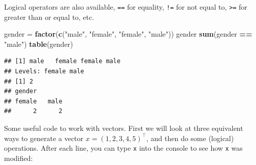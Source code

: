 \documentclass[]{article}
\newenvironment{Shaded}{\begin{snugshade}}{\end{snugshade}}
\newcommand{\KeywordTok}[1]{\textcolor[rgb]{0.13,0.29,0.53}{\textbf{#1}}}
\newcommand{\StringTok}[1]{\textcolor[rgb]{0.31,0.60,0.02}{#1}}
\newcommand{\OperatorTok}[1]{\textcolor[rgb]{0.81,0.36,0.00}{\textbf{#1}}}
\newcommand{\NormalTok}[1]{#1}
\begin{document}
Logical operators are also available, \texttt{==} for equality,
\texttt{!=} for not equal to, \texttt{\textgreater{}=} for greater than
or equal to, etc.

\begin{Shaded}
\begin{Highlighting}[]
\NormalTok{gender =}\StringTok{ }\KeywordTok{factor}\NormalTok{(}\KeywordTok{c}\NormalTok{(}\StringTok{"male"}\NormalTok{, }\StringTok{"female"}\NormalTok{, }\StringTok{"female"}\NormalTok{, }\StringTok{"male"}\NormalTok{))}
\NormalTok{gender}
\KeywordTok{sum}\NormalTok{(gender }\OperatorTok{==}\StringTok{ "male"}\NormalTok{)}
\KeywordTok{table}\NormalTok{(gender)}
\end{Highlighting}
\end{Shaded}

\begin{verbatim}
## [1] male   female female male  
## Levels: female male
## [1] 2
## gender
## female   male 
##      2      2
\end{verbatim}

Some useful code to work with vectors. First we will look at three
equivalent ways to generate a vector \(x=(1,2,3,4,5)^\top\), and then do
some (logical) operations. After each line, you can type \texttt{x} into
the console to see how \texttt{x} was modified:
\end{document}
